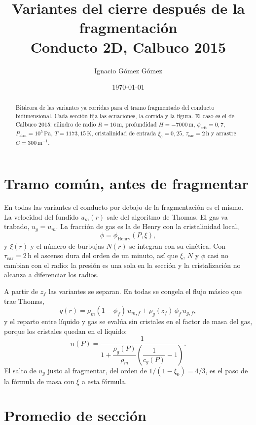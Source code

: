 \documentclass[11pt,a4paper]{article}
\title{\vspace{-1.2cm}\textbf{Variantes del cierre después de la fragmentación}\\[0.3em]
\large Conducto 2D, Calbuco 2015}
\author{Ignacio Gómez Gómez}
\date{\today}
\begin{document}
\maketitle
\vspace{-0.8cm}

\begin{abstract}\noindent
Bitácora de las variantes ya corridas para el tramo fragmentado del
conducto bidimensional. Cada sección fija las ecuaciones, la corrida
y la figura. El caso es el de Calbuco 2015: cilindro de radio
$R=16\,\mathrm{m}$, profundidad $H=-7000\,\mathrm{m}$,
$\phi_{\mathrm{crit}}=0{,}7$, $P_{\mathrm{atm}}=10^{5}\,\mathrm{Pa}$,
$T=1173{,}15\,\mathrm{K}$, cristalinidad de entrada $\xi_0=0{,}25$,
$\tau_{\mathrm{car}}=2\,\mathrm{h}$ y arrastre $C=300\,\mathrm{m}^{-1}$.
\end{abstract}

\tableofcontents
\vspace{0.5em}

\section{Tramo común, antes de fragmentar}

En todas las variantes el conducto por debajo de la fragmentación es el
mismo. La velocidad del fundido $u_m(r)$ sale del algoritmo de Thomas.
El gas va trabado, $u_g=u_m$. La fracción de gas es la de Henry con la
cristalinidad local,
\[
\phi=\phi_{\mathrm{Henry}}(P,\xi),
\]
y $\xi(r)$ y el número de burbujas $N(r)$ se integran con su cinética.
Con $\tau_{\mathrm{car}}=2\,\mathrm{h}$ el ascenso dura del orden de un
minuto, así que $\xi$, $N$ y $\phi$ casi no cambian con el radio: la
presión es una sola en la sección y la cristalización no alcanza a
diferenciar los radios.

A partir de $z_f$ las variantes se separan. En todas se congela el
flujo másico que trae Thomas,
\[
q(r)=\rho_m(1-\phi_f)\,u_{m,f}+\rho_g(z_f)\,\phi_f\,u_{g,f},
\]
y el reparto entre líquido y gas se evalúa sin cristales en el factor
de masa del gas, porque los cristales quedan en el líquido:
\[
n(P)=\frac{1}{1+\dfrac{\rho_g(P)}{\rho_m}\left(\dfrac{1}{c_g(P)}-1\right)}.
\]
El salto de $u_g$ justo al fragmentar, del orden de
$1/(1-\xi_0)=4/3$, es el paso de la fórmula de masa con $\xi$ a esta
fórmula.

\section{Promedio de sección}
\label{sec:media}
\end{document}
